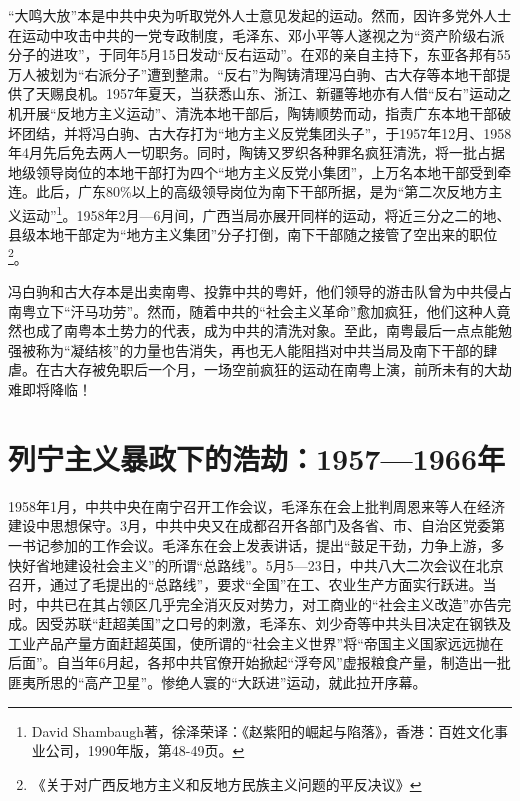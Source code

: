 “大鸣大放”本是中共中央为听取党外人士意见发起的运动。然而，因许多党外人士在运动中攻击中共的一党专政制度，毛泽东、邓小平等人遂视之为“资产阶级右派分子的进攻”，于同年5月15日发动“反右运动”。在邓的亲自主持下，东亚各邦有55万人被划为“右派分子”遭到整肃。“反右”为陶铸清理冯白驹、古大存等本地干部提供了天赐良机。1957年夏天，当获悉山东、浙江、新疆等地亦有人借“反右”运动之机开展“反地方主义运动”、清洗本地干部后，陶铸顺势而动，指责广东本地干部破坏团结，并将冯白驹、古大存打为“地方主义反党集团头子”，于1957年12月、1958年4月先后免去两人一切职务。同时，陶铸又罗织各种罪名疯狂清洗，将一批占据地级领导岗位的本地干部打为四个“地方主义反党小集团”，上万名本地干部受到牵连。此后，广东80\%以上的高级领导岗位为南下干部所据，是为“第二次反地方主义运动”\footnote{David Shambaugh著，徐泽荣译：《赵紫阳的崛起与陷落》，香港：百姓文化事业公司，1990年版，第48-49页。}。1958年2月—6月间，广西当局亦展开同样的运动，将近三分之二的地、县级本地干部定为“地方主义集团”分子打倒，南下干部随之接管了空出来的职位\footnote{《关于对广西反地方主义和反地方民族主义问题的平反决议》}。

冯白驹和古大存本是出卖南粤、投靠中共的粤奸，他们领导的游击队曾为中共侵占南粤立下“汗马功劳”。然而，随着中共的“社会主义革命”愈加疯狂，他们这种人竟然也成了南粤本土势力的代表，成为中共的清洗对象。至此，南粤最后一点点能勉强被称为“凝结核”的力量也告消失，再也无人能阻挡对中共当局及南下干部的肆虐。在古大存被免职后一个月，一场空前疯狂的运动在南粤上演，前所未有的大劫难即将降临！

\section{列宁主义暴政下的浩劫：1957—1966年}

1958年1月，中共中央在南宁召开工作会议，毛泽东在会上批判周恩来等人在经济建设中思想保守。3月，中共中央又在成都召开各部门及各省、市、自治区党委第一书记参加的工作会议。毛泽东在会上发表讲话，提出“鼓足干劲，力争上游，多快好省地建设社会主义”的所谓“总路线”。5月5—23日，中共八大二次会议在北京召开，通过了毛提出的“总路线”，要求“全国”在工、农业生产方面实行跃进。当时，中共已在其占领区几乎完全消灭反对势力，对工商业的“社会主义改造”亦告完成。因受苏联“赶超美国”之口号的刺激，毛泽东、刘少奇等中共头目决定在钢铁及工业产品产量方面赶超英国，使所谓的“社会主义世界”将“帝国主义国家远远抛在后面”。自当年6月起，各邦中共官僚开始掀起“浮夸风”虚报粮食产量，制造出一批匪夷所思的“高产卫星”。惨绝人寰的“大跃进”运动，就此拉开序幕。

